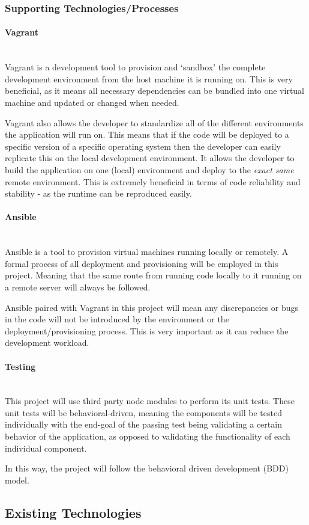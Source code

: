 \documentclass{article}
\begin{document}
\subsubsection{Supporting Technologies/Processes}
\label{subs:support}
\paragraph{Vagrant}\mbox{}\\
Vagrant is a development tool to provision and `sandbox' the complete development environment from the host machine it is running on. This is very beneficial, as it means all necessary dependencies can be bundled into one virtual machine and updated or changed when needed. 

Vagrant also allows the developer to standardize all of the different environments the application will run on. This means that if the code will be deployed to a specific version of a specific operating system then the developer can easily replicate this on the local development environment. It allows the developer to build the application on one (local) environment and deploy to the \textit{exact same} remote environment. This is extremely beneficial in terms of code reliability and stability - as the runtime can be reproduced easily.
\paragraph{Ansible}\mbox{}\\
Ansible is a tool to provision virtual machines running locally or remotely. A formal process of all deployment and provisioning will be employed in this project. Meaning that the same route from running code locally to it running on a remote server will always be followed.

Ansible paired with Vagrant in this project will mean any discrepancies or bugs in the code will not be introduced by the environment or the deployment/provisioning process. This is very important as it can reduce the development workload. 

\paragraph{Testing}\mbox{}\\
This project will use third party node modules to perform its unit tests. These unit tests will be behavioral-driven, meaning the components will be tested individually with the end-goal of the passing test being validating a certain behavior of the application, as opposed to validating the functionality of each individual component.

In this way, the project will follow the behavioral driven development (BDD) model. 

\subsection{Existing Technologies}


\newpage

\end{document}
